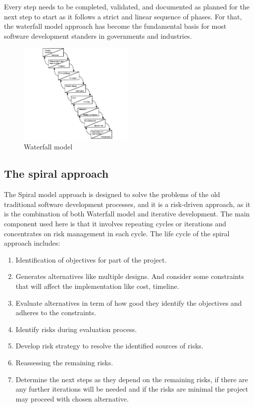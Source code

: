 \documentclass[conference,onecolumn]{IEEEtran}
\begin{document}
	Every step needs to be completed, validated, and documented as planned for the next step to start as it follows a strict and linear sequence of phases. For that, the waterfall model approach has become the fundamental basis for most software development standers in governments and industries.
	\begin{figure}[H]
		\centering
		\includegraphics[width=0.5\textwidth]{Figures/XP.png}
		\caption{Waterfall model}
		\label{fig:XP}
	\end{figure}

\subsection{The spiral approach}
	The Spiral model approach is designed to solve the problems of the old traditional software development processes, and it is a risk-driven approach, as it is the combination of both Waterfall model and iterative development. The main component used here is that it involves repeating cycles or iterations and concentrates on risk management in each cycle. The life cycle of the spiral approach includes:

	\begin{enumerate}
		\item Identification of objectives for part of the project.
		\item Generates alternatives like multiple designs. And consider some constraints that will affect the implementation like cost, timeline.
		\item Evaluate alternatives in term of how good they identify the objectives and adheres to the constraints.
		\item Identify risks during evaluation process.
		\item Develop risk strategy to resolve the identified sources of risks.
		\item Reassessing the remaining risks.
		\item Determine the next steps as they depend on the remaining risks, if there are any further iterations will be needed and if the risks are minimal the project may proceed with chosen alternative.
	\end{enumerate}
\end{document}
